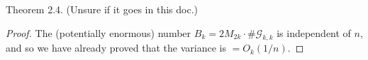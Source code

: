 \begin{theorem}
  \label{thm:wigner_law_matrix_moments}
  \notready
  Theorem 2.4. (Unsure if it goes in this doc.)
\end{theorem}

\begin{proof}
  \notready
  The (potentially enormous) number $B_k=2M_{2k}\cdot\#\mathcal{G}_{k,k}$ is independent of $n$, and so we have already proved that the variance is $=O_k(1/n)$.
\end{proof}








